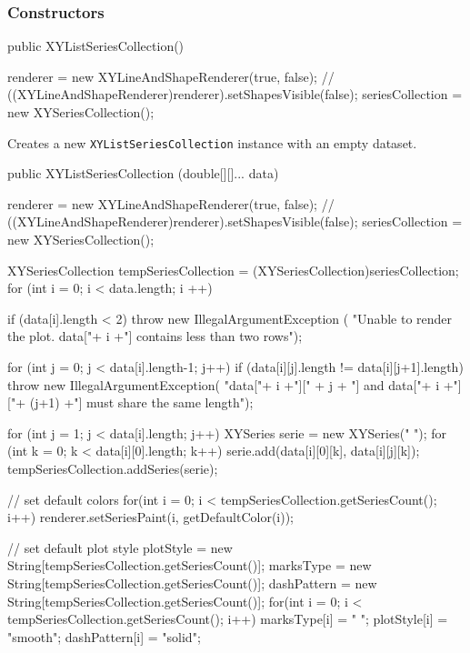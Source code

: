 \subsubsection*{Constructors}

\begin{code}
   public XYListSeriesCollection() \begin{hide} {
      renderer = new XYLineAndShapeRenderer(true, false);
     // ((XYLineAndShapeRenderer)renderer).setShapesVisible(false);
      seriesCollection = new XYSeriesCollection();
   }\end{hide}
\end{code}
\begin{tabb}
   Creates a new \texttt{XYListSeriesCollection} instance with an empty dataset.
\end{tabb}
\begin{code}

   public XYListSeriesCollection (double[][]... data) \begin{hide} {
      renderer = new XYLineAndShapeRenderer(true, false);
   //   ((XYLineAndShapeRenderer)renderer).setShapesVisible(false);
      seriesCollection = new XYSeriesCollection();

      XYSeriesCollection tempSeriesCollection = (XYSeriesCollection)seriesCollection;
      for (int i = 0; i < data.length; i ++) {

         if (data[i].length < 2)
            throw new IllegalArgumentException (
               "Unable to render the plot. data["+ i +"] contains less than two rows");

         for (int j = 0; j < data[i].length-1; j++)
            if (data[i][j].length != data[i][j+1].length)
               throw new IllegalArgumentException(
                  "data["+ i +"][" + j + "] and data["+ i +"]["+ (j+1) +"] must share the same length");

         for (int j = 1; j < data[i].length; j++) {
            XYSeries serie = new XYSeries(" ");
            for (int k = 0; k < data[i][0].length; k++)
               serie.add(data[i][0][k], data[i][j][k]);
            tempSeriesCollection.addSeries(serie);
         }
      }

      // set default colors
      for(int i = 0; i < tempSeriesCollection.getSeriesCount(); i++)
         renderer.setSeriesPaint(i, getDefaultColor(i));

      // set default plot style
      plotStyle = new String[tempSeriesCollection.getSeriesCount()];
      marksType = new String[tempSeriesCollection.getSeriesCount()];
      dashPattern = new String[tempSeriesCollection.getSeriesCount()];
      for(int i = 0; i < tempSeriesCollection.getSeriesCount(); i++) {
         marksType[i] = " ";
         plotStyle[i] = "smooth";
         dashPattern[i] = "solid";
      }
   }\end{hide}
\end{code}
